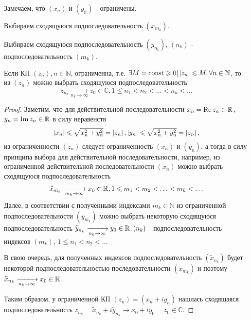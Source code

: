 
\begin{plan}
\item Замечаем, что $(x_n)$ и $(y_n)$ - ограничены.
\item Выбираем сходящуюся подпоследовательность $(x_{m_k})$.
\item Выбираем сходящуюся подпоследовательность $(y_{n_k})$, $(n_k)$ - подпоследовательность $(m_k)$.
\end{plan}

\begin{col-answer-preambule}
\end{col-answer-preambule}
\begin{theorem}
  Если КП $(z_n), n \in \mathbb{N}$, ограниченна, т.е. $\exists M = \operatorname{\text{const}} \geqslant 0 \vert \left\lvert z_n \right\rvert \leqslant M, \forall n \in \mathbb{N}$,
  то из $(z_n)$ можно выбрать сходящуюся подпоследовательность
  \begin{equation}
    \label{eq:lecture10-04}
    z_{n_k} \xrightarrow[n_k \to \infty]{} z_0 \in \mathbb{C}, 1 \leqslant n_1 < n_2 < \ldots < n_k < \ldots
  \end{equation}
\end{theorem}
\begin{proof}
  Заметим, что для действительной последовательности ${x_n = \operatorname{Re}z_n \in \mathbb{R}^{}}$,
  ${y_n = \operatorname{Im}z_n \in \mathbb{R}^{}}$ в силу неравенств
  \begin{align*}
    \left\lvert x_n \right\rvert \leqslant \sqrt{x_n^2 + y_n^2} = \left\lvert z_n \right\rvert,
    \left\lvert y_n \right\rvert \leqslant \sqrt{x_n^2 + y_n^2} = \left\lvert z_n \right\rvert,
  \end{align*}
  из ограниченности $(z_n)$ следует ограниченность $(x_n)$ и $(y_n)$, а тогда в силу принципа выбора
  для действительной последовательности, например, из ограниченной действительной последовательности
  $(x_n)$ можно выбрать сходящуюся подпоследовательность
  \begin{align*}
    \widetilde{x}_{m_k}\xrightarrow[m_k \to \infty]{} x_0 \in \mathbb{R}^{},
    1 \leqslant m_1 < m_2 < \ldots < m_k < \ldots
  \end{align*}
  Далее, в соответствии с полученными индексами $m_k \in \mathbb{N}$ из ограниченной
  подпоследовательности $(y_{m_k})$ можно выбрать некоторую сходящуюся подпоследовательность
  $\widetilde{y}_{n_k} \xrightarrow[n_k \to \infty]{}y_0 \in \mathbb{R}^{}, (n_k)$ - подпоследовательность
  индексов $(m_k)$, ${1 \leqslant n_1 < n_2 < \ldots}$

  В свою очередь, для полученных индексов подпоследовательность $(\widetilde{x}_{n_k})$ будет
  некоторой подпоследовательностью последовательности $(\widetilde{x}_{m_k})$ и поэтому
  $\widetilde{x}_{n_k} \xrightarrow[n_k \to \infty]{} x_0 \in \mathbb{R}^{}$.

  Таким образом, у ограниченной КП $(z_n) = (x_n + iy_n)$ нашлась сходящаяся подпоследовательность
  $z_{n_k} = \widetilde{x}_{n_k} + i\widetilde{y}_{n_k} \to x_0 + iy_0 = z_0 \in \mathbb{C}$.
\end{proof}
